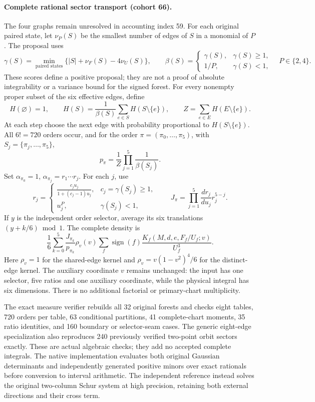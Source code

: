 \documentclass[11pt]{article}
\begin{document}
\paragraph{Complete rational sector transport (cohort 66).}
The four graphs remain unresolved in accounting index 59. For each original
paired state, let \(\nu_P(S)\) be the smallest number of edges of \(S\) in a
monomial of \(P\). The proposal uses
\[
 \gamma(S)=\min_{\text{paired states}}
 \{ |S|+\nu_F(S)-4\nu_U(S)\},\qquad
 \beta(S)=\begin{cases}\gamma(S),&\gamma(S)\ge1,\\1/P,&\gamma(S)<1,\end{cases}
 \quad P\in\{2,4\}.
\]
These scores define a positive proposal; they are not a proof of absolute
integrability or a variance bound for the signed forest.
For every nonempty proper subset of the six effective edges, define
\[
 H(\varnothing)=1,\qquad
 H(S)=\frac{1}{\beta(S)}\sum_{e\in S}H(S\setminus\{e\}),\qquad
 Z=\sum_{e\in E}H(E\setminus\{e\}).
\]
At each step choose the next edge with probability proportional to
\(H(S\setminus\{e\})\). All \(6!=720\) orders occur, and for the order
\(\pi=(\pi_0,\ldots,\pi_5)\), with \(S_j=\{\pi_j,\ldots,\pi_5\}\),
\[
 p_\pi=\frac1Z\prod_{j=1}^5\frac1{\beta(S_j)}.
\]
Set \(\alpha_{\pi_0}=1\), \(\alpha_{\pi_j}=r_1\cdots r_j\). For each
\(j\), use
\[
 r_j=\begin{cases}
 \displaystyle\frac{c_j u_j}{1+(c_j-1)u_j},&c_j=\gamma(S_j)\ge1,\\
 u_j^P,&\gamma(S_j)<1,
 \end{cases}
 \qquad
 J_\pi=\prod_{j=1}^5\frac{dr_j}{du_j}r_j^{5-j}.
\]
If \(y\) is the independent order selector, average its six translations
\((y+k/6)\bmod1\). The complete density is
\[
 \frac16\sum_{k=0}^5\frac{J_{\pi_k}}{p_{\pi_k}}
 \rho_v(v)\sum_f\operatorname{sign}(f)
 \frac{K_f(M,d,e,F_f/U_f;v)}{U_f^3}.
\]
Here \(\rho_v=1\) for the shared-edge kernel and
\(\rho_v=v(1-v^2)^4/6\) for the distinct-edge kernel. The auxiliary
coordinate \(v\) remains unchanged: the input has one selector, five ratios
and one auxiliary coordinate, while the physical integral has six dimensions.
There is no additional factorial or primary-chart multiplicity.

The exact measure verifier rebuilds all 32 original forests and checks eight
tables, 720 orders per table, 63 conditional partitions, 41 complete-chart
moments, 35 ratio identities, and 160 boundary or selector-seam cases.
The generic eight-edge specialization also reproduces 240 previously verified
two-point orbit sectors exactly. These are actual algebraic checks; they add
no accepted complete integrals. The native implementation evaluates both
original Gaussian determinants and independently generated positive minors
over exact rationals before conversion to interval arithmetic. The independent
reference instead solves the original two-column Schur system at high
precision, retaining both external directions and their cross term.
\end{document}
